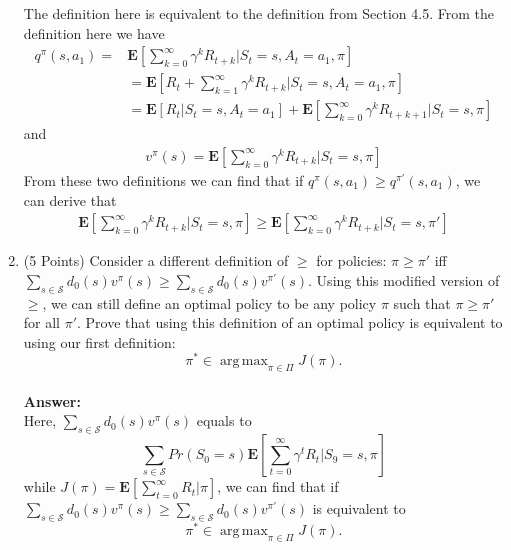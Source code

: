 \documentclass[]{article}
\DeclareMathOperator*{\argmax}{arg\,max}
\begin{document}
\begin{enumerate}
    The definition here is equivalent to the definition from Section 4.5. From the definition here we have
    \begin{align}
        q^{\pi}(s,a_1)=&\mathbf{E}[\sum_{k=0}^{\infty}\gamma^k R_{t+k}|S_t=s,A_t=a_1,\pi]\\
        &=\mathbf{E}[R_t+\sum_{k=1}^{\infty}\gamma^k R_{t+k}|S_t=s,A_t=a_1,\pi]\\
        &=\mathbf{E}[R_t|S_t=s,A_t=a_1]+\mathbf{E}[\sum_{k=0}^{\infty}\gamma^k R_{t+k+1}|S_t=s,\pi]
    \end{align}
    and 
    \begin{align}
        v^{\pi}(s)=\mathbf{E}[\sum_{k=0}^{\infty}\gamma^k R_{t+k}|S_t=s,\pi]
    \end{align}
    From these two definitions we can find that if $q^\pi(s,a_1) \geq q^{\pi'}(s,a_1)$, we can derive that
    \begin{align}
        \mathbf{E}[\sum_{k=0}^{\infty}\gamma^k R_{t+k}|S_t=s,\pi]
        \geq \mathbf{E}[\sum_{k=0}^{\infty}\gamma^k R_{t+k}|S_t=s,\pi']
    \end{align}

    \item (5 Points) Consider a different definition of $\geq$ for policies: $\pi \geq \pi'$ iff $\sum_{s \in \mathcal S}d_0(s)v^\pi(s) \geq \sum_{s \in \mathcal S}d_0(s)v^{\pi'}(s)$. Using this modified version of $\geq$, we can still define an optimal policy to be any policy $\pi$ such that $\pi \geq \pi'$ for all $\pi'$. Prove that using this definition of an optimal policy is equivalent to using our first definition:
    \begin{equation}
        \label{eq:optimalPolicyOriginal}
        \pi^* \in \argmax_{\pi \in \Pi} J(\pi).
    \end{equation} 
    \\
    \textbf{Answer:}\\
    Here, $\sum_{s \in \mathcal S}d_0(s)v^\pi(s)$ equals to
    \begin{equation}
        \sum_{s\in\mathcal S}Pr(S_0=s)\mathbf{E}[\sum_{t=0}^{\infty}\gamma^t R_t|S_9=s, \pi]
    \end{equation} 
    while $J(\pi)=\mathbf{E}[\sum_{t=0}^{\infty}R_t|\pi]$, we can find that if $\sum_{s \in \mathcal S}d_0(s)v^\pi(s) \geq \sum_{s \in \mathcal S}d_0(s)v^{\pi'}(s)$ is equivalent to 
    \begin{equation}
        \pi^* \in \argmax_{\pi \in \Pi} J(\pi).
    \end{equation} 
    


\end{enumerate}
\end{document}
